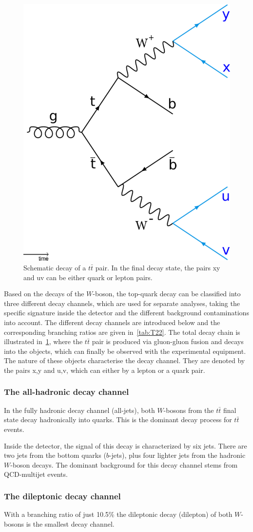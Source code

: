 \begin{figure}[h]
	\centering
	\includegraphics[width=0.3\linewidth]{Pics/cp1/Decay}
	\caption{Schematic decay of a $t\bar{t}$ pair. In the final decay state, the pairs xy and uv can be either quark or lepton pairs.  }
	\label{fig:Decay}
\end{figure}

 Based on the decays of the $W$-boson, the top-quark decay can be classified into three different decay channels, which are used for separate analyses, taking the specific signature inside the detector and the different background contaminations into account. The different decay channels are introduced below and  the corresponding branching ratios are given in~\cref{tab:T22}. The total decay chain is illustrated in~\cref{fig:Decay}, where the  $t\bar{t}$ pair is produced via  gluon-gluon fusion and  decays into the objects, which can finally be observed with the experimental equipment. The nature of these objects characterise the decay channel. They are denoted by the pairs x,y and u,v, which can either by a lepton or a quark pair.




\subsubsection{The all-hadronic decay channel}
In the fully hadronic decay channel (all-jets), both $W$-bosons from the $t\bar{t}$ final state decay hadronically into quarks. This is the dominant decay process for $t\bar{t}$ events. 

 Inside the detector, the signal of this decay is characterized by six jets. There are two jets  from the bottom quarks ($b$-jets), plus four lighter jets from the hadronic $W$-boson decays. The dominant background  for this decay channel stems from QCD-multijet events.

\subsubsection{The dileptonic decay channel}
With a branching ratio of just 10.5\% the dileptonic decay (dilepton) of both $W$-bosons is the smallest decay channel. 

